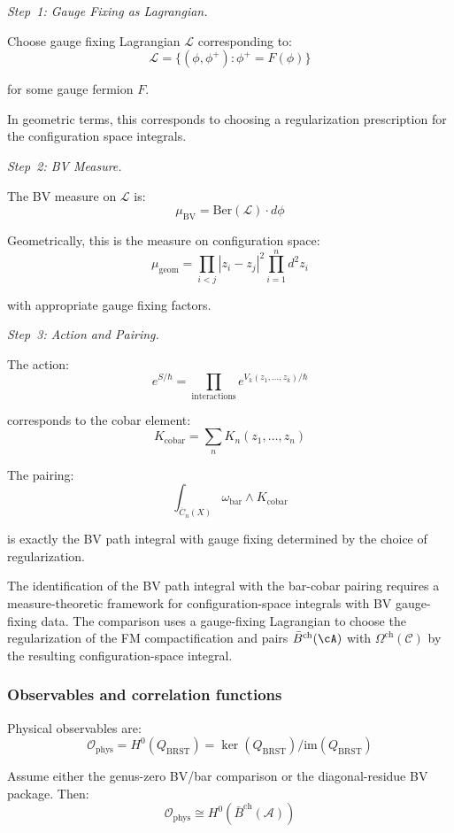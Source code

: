 \begin{remark}
\emph{Step~1: Gauge Fixing as Lagrangian.}

Choose gauge fixing Lagrangian $\mathcal{L}$ corresponding to:
\[\mathcal{L} = \{(\phi, \phi^+) : \phi^+ = F(\phi)\}\]

for some gauge fermion $F$.

In geometric terms, this corresponds to choosing a regularization prescription
for the configuration space integrals.

\emph{Step~2: BV Measure.}

The BV measure on $\mathcal{L}$ is:
\[\mu_{\text{BV}} = \text{Ber}(\mathcal{L}) \cdot d\phi\]

Geometrically, this is the measure on configuration space:
\[\mu_{\text{geom}} = \prod_{i<j} |z_i - z_j|^2 \prod_{i=1}^n d^2z_i\]

with appropriate gauge fixing factors.

\emph{Step~3: Action and Pairing.}

The action:
\[e^{S/\hbar} = \prod_{\text{interactions}} e^{V_k(z_1, \ldots, z_k)/\hbar}\]

corresponds to the cobar element:
\[K_{\text{cobar}} = \sum_n K_n(z_1, \ldots, z_n)\]

The pairing:
\[\int_{\overline{C}_n(X)} \omega_{\text{bar}} \wedge K_{\text{cobar}}\]

is exactly the BV path integral with gauge fixing determined by the choice of
regularization.
\end{remark}

\begin{remark}
The identification of the BV path integral with the bar-cobar pairing
requires a measure-theoretic framework for configuration-space
integrals with BV gauge-fixing data. The comparison uses a gauge-fixing
Lagrangian to choose the regularization of the FM compactification and
pairs $\bar{B}^{\mathrm{ch}}(\cA)$ with
$\Omega^{\mathrm{ch}}(\mathcal{C})$ by the resulting configuration-space
integral.
\end{remark}

\subsubsection{Observables and correlation functions}

\begin{theorem}
\label{thm:observables-brst-cohomology}
Physical observables are:
\[\mathcal{O}_{\text{phys}} = H^0(Q_{\text{BRST}}) =
\ker(Q_{\text{BRST}})/\text{im}(Q_{\text{BRST}})\]

Assume either the genus-zero BV/bar comparison or the
diagonal-residue BV package. Then:
\[\mathcal{O}_{\text{phys}} \cong H^0(\bar{B}^{\text{ch}}(\mathcal{A}))\]
\end{theorem}

